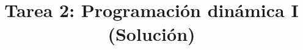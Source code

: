 \documentclass{doc}
\title{Tarea 2: Programación dinámica I (Solución)}
\begin{document}
\makedocheader
\soluciontrue

\end{document}
